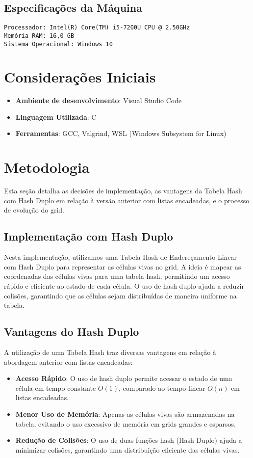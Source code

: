 \documentclass[a4paper,12pt]{article}
\begin{document}
\subsection{Especificações da Máquina}
\begin{verbatim}
Processador: Intel(R) Core(TM) i5-7200U CPU @ 2.50GHz
Memória RAM: 16,0 GB
Sistema Operacional: Windows 10
\end{verbatim}

\section{Considerações Iniciais}
\begin{itemize}
    \item \textbf{Ambiente de desenvolvimento}: Visual Studio Code
    \item \textbf{Linguagem Utilizada}: C
    \item \textbf{Ferramentas}: GCC, Valgrind, WSL (Windows Subsystem for Linux)
\end{itemize}

\section{Metodologia}
Esta seção detalha as decisões de implementação, as vantagens da Tabela Hash com Hash Duplo em relação à versão anterior com listas encadeadas, e o processo de evolução do grid.

\subsection{Implementação com Hash Duplo}
Nesta implementação, utilizamos uma Tabela Hash de Endereçamento Linear com Hash Duplo para representar as células vivas no grid. A ideia é mapear as coordenadas das células vivas para uma tabela hash, permitindo um acesso rápido e eficiente ao estado de cada célula. O uso de hash duplo ajuda a reduzir colisões, garantindo que as células sejam distribuídas de maneira uniforme na tabela.

\subsection{Vantagens do Hash Duplo}
A utilização de uma Tabela Hash traz diversas vantagens em relação à abordagem anterior com listas encadeadas:
\begin{itemize}
    \item \textbf{Acesso Rápido}: O uso de hash duplo permite acessar o estado de uma célula em tempo constante \(O(1)\), comparado ao tempo linear \(O(n)\) em listas encadeadas.
    \item \textbf{Menor Uso de Memória}: Apenas as células vivas são armazenadas na tabela, evitando o uso excessivo de memória em grids grandes e esparsos.
    \item \textbf{Redução de Colisões}: O uso de duas funções hash (Hash Duplo) ajuda a minimizar colisões, garantindo uma distribuição eficiente das células vivas.
\end{itemize}
\end{document}
